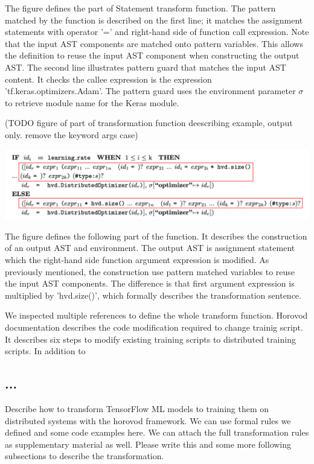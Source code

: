 The figure defines the part of Statement transform function. 
The pattern matched by the function is described on the first line;
it matches the assignment statements with operator '=' and
right-hand side of function call expression.
Note that the input AST components are matched onto pattern variables.
This allows the definition to reuse the input AST component
when constructing the output AST.
The second line illustrates pattern guard that matches the input AST content.
It checks the callee expression is the expression 'tf.keras.optimizers.Adam'.
The pattern guard uses the environment parameter $\sigma$ to retrieve
module name for the Keras module.

(TODO figure of part of transformation function deescribing example,
output only. remove the keyword args case)

\includegraphics[width=15cm]{trans_ex02}

The figure defines the following part of the function.
It describes the construction of an output AST and environment.
The output AST is assignment statement which
the right-hand side function argument expression is modified.
As previously mentioned, the construction use pattern matched variables
to reuse the input AST components.
The difference is that first argument expression is multiplied by 'hvd.size()',
which formally describes the transformation sentence.

We inspected multiple references to define the whole transform function.
Horovod documentation\cite{horovodtf} describes the code modification
required to change trainig script. It describes six steps to modify
existing training scripts to distributed training scripts. 
In addition to 

\subsection{...}
Describe how to transform TensorFlow ML models to training them on distributed
systems with the horovod framework. We can use formal rules we defined and some
code examples here. We can attach the full transformation rules as
supplementary material as well.  Please write this and some more following
subsections to describe the transformation.
